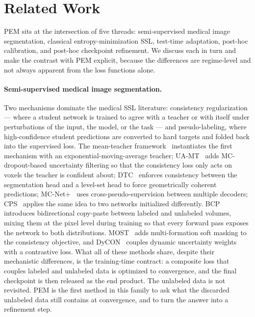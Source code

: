 \section{Related Work}
\label{sec:related}

PEM sits at the intersection of five threads: semi-supervised medical image segmentation, classical entropy-minimization SSL, test-time adaptation, post-hoc calibration, and post-hoc checkpoint refinement. We discuss each in turn and make the contrast with PEM explicit, because the differences are regime-level and not always apparent from the loss functions alone.

\paragraph{Semi-supervised medical image segmentation.}
Two mechanisms dominate the medical SSL literature: consistency regularization --- where a student network is trained to agree with a teacher or with itself under perturbations of the input, the model, or the task --- and pseudo-labeling, where high-confidence student predictions are converted to hard targets and folded back into the supervised loss. The mean-teacher framework~\cite{tarvainen2017meanteacher} instantiates the first mechanism with an exponential-moving-average teacher; UA-MT~\cite{yu2019uamt} adds MC-dropout-based uncertainty filtering so that the consistency loss only acts on voxels the teacher is confident about; DTC~\cite{luo2022dtc} enforces consistency between the segmentation head and a level-set head to force geometrically coherent predictions; MC-Net+~\cite{wu2022mcnet} uses cross-pseudo-supervision between multiple decoders; CPS~\cite{chen2021cps} applies the same idea to two networks initialized differently. BCP~\cite{bai2023bcp} introduces bidirectional copy-paste between labeled and unlabeled volumes, mixing them at the pixel level during training so that every forward pass exposes the network to both distributions. MOST~\cite{liu2024most} adds multi-formation soft masking to the consistency objective, and DyCON~\cite{assefa2025dycon} couples dynamic uncertainty weights with a contrastive loss. What all of these methods share, despite their mechanistic differences, is the training-time contract: a composite loss that couples labeled and unlabeled data is optimized to convergence, and the final checkpoint is then released as the end product. The unlabeled data is not revisited. PEM is the first method in this family to ask what the discarded unlabeled data still contains at convergence, and to turn the answer into a refinement step.

